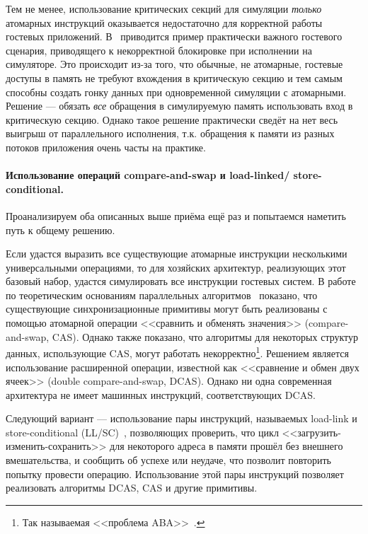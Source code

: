 Тем не менее, использование критических секций для симуляции \emph{только} атомарных инструкций оказывается недостаточно для корректной работы гостевых приложений. В~\cite{coremu} приводится пример практически важного гостевого сценария, приводящего к некорректной блокировке при исполнении на симуляторе. Это происходит из-за того, что обычные, не атомарные, гостевые доступы в память не требуют вхождения в критическую секцию и тем самым способны создать гонку данных при одновременной симуляции с атомарными. Решение — обязать \emph{все} обращения в симулируемую память использовать вход в критическую секцию. Однако такое решение практически сведёт на нет весь выигрыш от параллельного исполнения, т.к. обращения к памяти из разных потоков приложения очень часты на практике.

\paragraph{Использование операций compare-and-swap и load-linked/ store-conditional.}  Проанализируем оба описанных выше приёма ещё раз и попытаемся наметить путь к общему решению.

Если удастся выразить все существующие атомарные инструкции несколькими универсальными операциями, то для хозяйских архитектур, реализующих этот базовый набор, удастся симулировать все инструкции гостевых систем. В работе по теоретическим основаниям параллельных алгоритмов~\cite{Herlihy:1991:WS:114005.102808} показано, что существующие синхронизационные примитивы могут быть реализованы с помощью атомарной операции <<сравнить и обменять значения>> (\abbr compare-and-swap, CAS). Однако также показано, что алгоритмы для некоторых структур данных, использующие CAS, могут работать некорректно\footnote{Так называемая <<проблема ABA>>~\cite{aba-problem}.}. Решением является использование расширенной операции, известной как <<сравнение и обмен двух ячеек>> (\abbr double compare-and-swap, DCAS). Однако ни одна современная архитектура не имеет машинных инструкций, соответствующих DCAS.

Следующий вариант — использование пары инструкций, называемых load-link и store-conditional (LL/SC)~\cite{jensen:load-linked}, позволяющих проверить, что цикл <<загрузить-изменить-сохранить>> для некоторого адреса в памяти прошёл без внешнего вмешательства, и сообщить об успехе или неудаче, что позволит повторить попытку провести операцию. Использование этой пары инструкций позволяет реализовать алгоритмы DCAS, CAS и другие примитивы.

